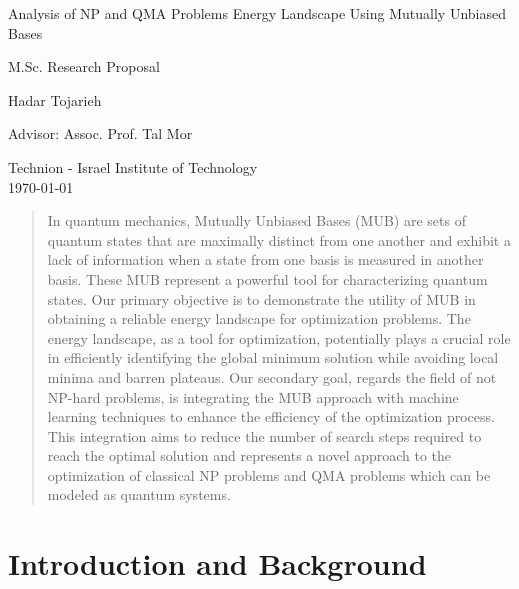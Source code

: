 \documentclass[12pt, a4paper]{article}
\begin{document}
    \onehalfspacing

    {\centering
    {\LARGE Analysis of NP and QMA Problems Energy Landscape Using Mutually Unbiased Bases \par}
    {\Medium M.Sc. Research Proposal }

    {\Small Hadar Tojarieh \par }
    {\Small Advisor: Assoc. Prof. Tal Mor \par }
    {\Small Technion - Israel Institute of Technology\\}
    \today
    \par
    }

    \singlespacing

    \begin{abstract}
        In quantum mechanics, Mutually Unbiased Bases (MUB) are sets of quantum states that are maximally distinct
        from one another and exhibit a lack of information when a state from one basis is measured in another basis.
        These MUB represent a powerful tool for characterizing quantum states.
        Our primary objective is to demonstrate the utility of MUB in obtaining a reliable energy landscape
        for optimization problems.
        The energy landscape, as a tool for optimization, potentially plays a crucial role in efficiently identifying
        the global minimum solution while avoiding local minima and barren plateaus.
        Our secondary goal, regards the field of not NP-hard problems,
        is integrating the MUB approach with machine learning techniques to enhance the efficiency of the
        optimization process.
        This integration aims to reduce the number of search steps required to reach the optimal
        solution and represents a novel approach to the optimization of classical NP problems and QMA problems which can be modeled as
        quantum systems.
    \end{abstract}

    \tableofcontents

    \onehalfspacing


    \section{Introduction and Background}\label{sec:introduction-and-background}
    
\end{document}
